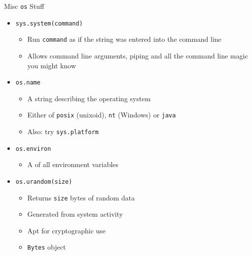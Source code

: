 \begin{frame}{Misc \texttt{os} Stuff}
%
\begin{itemize}
\item \texttt{sys.system(command)}
	\begin{itemize}
	\item Run \texttt{command} as if the string was entered into the command line
	\item Allows command line arguments, piping and all the command line magic you might know
	\end{itemize}
\item \texttt{os.name}
	\begin{itemize}
	\item A string describing the operating system
	\item Either of \texttt{posix} (unixoid), \texttt{nt} (Windows) or \texttt{java}
	\item Also: try \texttt{sys.platform}
	\end{itemize}
\item \texttt{os.environ}
	\begin{itemize}
	\item A  of all environment variables
	\end{itemize}
\item \texttt{os.urandom(size)}
	\begin{itemize}
	\item Returns \texttt{size} bytes of random data
	\item Generated from system activity
	\item Apt for cryptographic use
	\item \texttt{Bytes} object
	\end{itemize}
\end{itemize}
%
\end{frame}